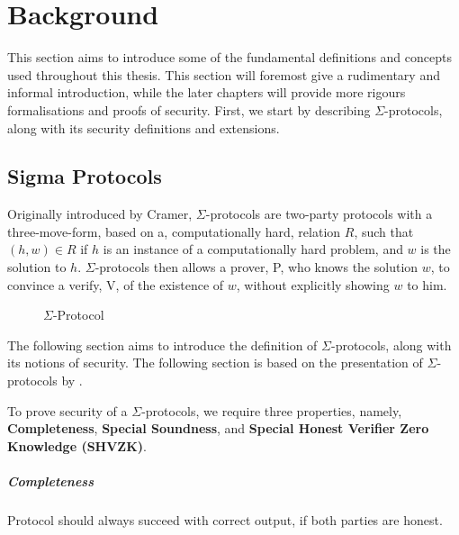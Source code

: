 \chapter{Background}
\label{ch:background}
This section aims to introduce some of the fundamental definitions and concepts
used throughout this thesis. This section will foremost give a rudimentary and
informal introduction, while the later chapters will provide more rigours
formalisations and proofs of security.
First, we start by describing $\Sigma$-protocols, along with its security
definitions and extensions.


\section{Sigma Protocols}
\label{sec:background:sigma_protocols}
Originally introduced by Cramer, $\Sigma$-protocols are two-party protocols with a
three-move-form, based on a, computationally hard, relation $R$, such that $(h, w) \in R$
if $h$ is an instance of a computationally hard problem, and $w$ is
the solution to $h$. $\Sigma$-protocols then allows a prover, P, who knows the
solution $w$, to convince a verify, V, of the existence of $w$, without
explicitly showing $w$ to him.

\begin{figure}[ht]
  \centering
  \caption{\label{fig:proto_sigma} $\Sigma$-Protocol}
\end{figure}


The following section aims to introduce the definition of $\Sigma$-protocols,
along with its notions of security. The following section is based on the
presentation of $\Sigma$-protocols by \citet{on-sigma-protocols}.


To prove security of a $\Sigma$-protocols, we require three properties, namely,
\textbf{Completeness}, \textbf{Special Soundness}, and \textbf{Special Honest Verifier Zero Knowledge (SHVZK)}.

\paragraph{Completeness}
Protocol should always succeed with correct output, if both parties are honest.

